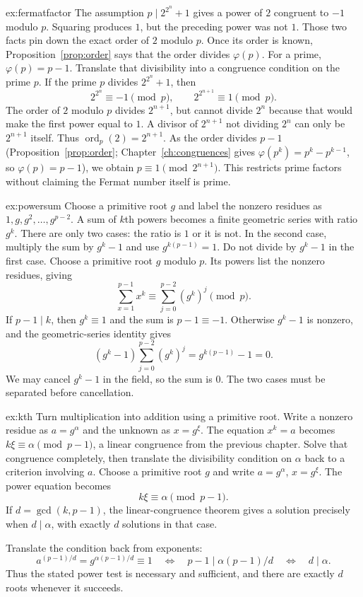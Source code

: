 \begin{solution}{ex:fermatfactor}
\idea The assumption $p\mid 2^{2^n}+1$ gives a power of $2$ congruent to $-1$ modulo $p$. Squaring produces $1$, but the preceding power was not $1$. Those two facts pin down the exact order of $2$ modulo $p$. Once its order is known, Proposition~\ref{prop:order} says that the order divides $\varphi(p)$. For a prime, $\varphi(p)=p-1$. Translate that divisibility into a congruence condition on the prime $p$.
\writeup If the prime $p$ divides $2^{2^n}+1$, then
\[
2^{2^n}\equiv-1\pmod p,\qquad
2^{2^{n+1}}\equiv1\pmod p.
\]
The order of $2$ modulo $p$ divides $2^{n+1}$, but cannot divide $2^n$ because that would make the first power equal to $1$. A divisor of $2^{n+1}$ not dividing $2^n$ can only be $2^{n+1}$ itself. Thus $\operatorname{ord}_p(2)=2^{n+1}$. As the order divides $p-1$ (Proposition~\ref{prop:order}; Chapter~\ref{ch:congruences} gives $\varphi(p^k)=p^k-p^{k-1}$, so $\varphi(p)=p-1$), we obtain $p\equiv1\pmod{2^{n+1}}$. This restricts prime factors without claiming the Fermat number itself is prime.
\end{solution}

\begin{solution}{ex:powersum}
\idea Choose a primitive root $g$ and label the nonzero residues as $1,g,g^2,\ldots,g^{p-2}$. A sum of $k$th powers becomes a finite geometric series with ratio $g^k$. There are only two cases: the ratio is $1$ or it is not. In the second case, multiply the sum by $g^k-1$ and use $g^{k(p-1)}=1$. Do not divide by $g^k-1$ in the first case.
\writeup Choose a primitive root $g$ modulo $p$. Its powers list the nonzero residues, giving
\[
\sum_{x=1}^{p-1}x^k\equiv\sum_{j=0}^{p-2}(g^k)^j\pmod p.
\]
If $p-1\mid k$, then $g^k\equiv1$ and the sum is $p-1\equiv-1$. Otherwise $g^k-1$ is nonzero, and the geometric-series identity gives
\[
(g^k-1)\sum_{j=0}^{p-2}(g^k)^j=g^{k(p-1)}-1=0.
\]
We may cancel $g^k-1$ in the field, so the sum is $0$. The two cases must be separated before cancellation.
\end{solution}

\begin{solution}{ex:kth}
\idea Turn multiplication into addition using a primitive root. Write a nonzero residue as $a=g^\alpha$ and the unknown as $x=g^\xi$. The equation $x^k=a$ becomes $k\xi\equiv\alpha\pmod{p-1}$, a linear congruence from the previous chapter. Solve that congruence completely, then translate the divisibility condition on $\alpha$ back to a criterion involving $a$.
\writeup Choose a primitive root $g$ and write $a=g^\alpha$, $x=g^\xi$. The power equation becomes
\[
k\xi\equiv\alpha\pmod{p-1}.
\]
If $d=\gcd(k,p-1)$, the linear-congruence theorem gives a solution precisely when $d\mid\alpha$, with exactly $d$ solutions in that case.

Translate the condition back from exponents:
\[
a^{(p-1)/d}=g^{\alpha(p-1)/d}\equiv1
\quad\Longleftrightarrow\quad
p-1\mid\alpha(p-1)/d
\quad\Longleftrightarrow\quad d\mid\alpha.
\]
Thus the stated power test is necessary and sufficient, and there are exactly $d$ roots whenever it succeeds.
\end{solution}

